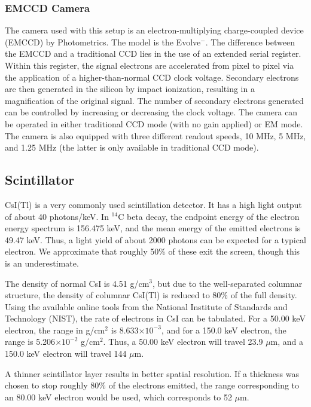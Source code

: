 \documentclass[11pt]{article}
\begin{document}
\subsubsection{EMCCD Camera}
The camera used with this setup is an electron-multiplying charge-coupled device (EMCCD) by Photometrics.  The model is the Evolve$^-$.  The difference between the EMCCD and a traditional CCD lies in the use of an extended serial register.  Within this register, the signal electrons are accelerated from pixel to pixel via the application of a higher-than-normal CCD clock voltage.  Secondary electrons are then generated in the silicon by impact ionization, resulting in a magnification of the original signal.  The number of secondary electrons generated can be controlled by increasing or decreasing the clock voltage.  The camera can be operated in either traditional CCD mode (with no gain applied) or EM mode.  The camera is also equipped with three different readout speeds, 10 MHz, 5 MHz, and 1.25 MHz (the latter is only available in traditional CCD mode).   

\subsection{Scintillator}\label{sec:CsI}
CsI(Tl) is a very commonly used scintillation detector.  It has a high light output of about 40 photons/keV.  In $^{14}$C beta decay, the endpoint energy of the electron energy spectrum is 156.475 keV, and the mean energy of the emitted electrons is 49.47 keV.  Thus, a light yield of about 2000 photons can be expected for a typical electron.  We approximate that roughly 50\% of these exit the screen, though this is an underestimate.

The density of normal CsI is 4.51 g/cm$^3$, but due to the well-separated columnar structure, the density of columnar CsI(Tl) is reduced to 80\% of the full density.  Using the available online tools from the National Institute of Standards and Technology (NIST), the rate of electrons in CsI can be tabulated.  For a 50.00 keV electron, the range in g/cm$^2$ is 8.633$\times10^{-3}$, and for a 150.0 keV electron, the range is 5.206$\times10^{-2}$ g/cm$^2$.  Thus, a 50.00 keV electron will travel 23.9 $\mu$m, and a 150.0 keV electron will travel 144 $\mu$m.  

A thinner scintillator layer results in better spatial resolution.  If a thickness was chosen to stop roughly 80\% of the electrons emitted, the range corresponding to an 80.00 keV electron would be used, which corresponds to 52 $\mu$m. 
\end{document}

